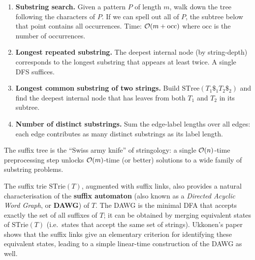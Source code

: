 \begin{enumerate}[nosep]
  \item \textbf{Substring search.}
        Given a pattern $P$ of length $m$, walk down the tree following
        the characters of $P$.
        If we can spell out all of $P$, the subtree below that point
        contains all occurrences.
        Time: $\mathcal{O}\!\left(m + \text{occ}\right)$ where $\text{occ}$ is the number
        of occurrences.

  \item \textbf{Longest repeated substring.}
        The deepest internal node (by string-depth) corresponds to the
        longest substring that appears at least twice.
        A single DFS suffices.

  \item \textbf{Longest common substring of two strings.}
        Build $\mathrm{STree}(T_1 \$_1 T_2 \$_2)$ and find the
        deepest internal node that has leaves from both $T_1$ and $T_2$
        in its subtree.

  \item \textbf{Number of distinct substrings.}
        Sum the edge-label lengths over all edges: each edge contributes
        as many distinct substrings as its label length.
\end{enumerate}

\begin{observation}
  The suffix tree is the ``Swiss army knife'' of stringology: a single
  $\mathcal{O}\!\left(n\right)$-time preprocessing step unlocks $\mathcal{O}\!\left(m\right)$-time (or better)
  solutions to a wide family of substring problems.
\end{observation}

\begin{remark}
  \label{rem:dawg}
  The suffix trie $\mathrm{STrie}(T)$, augmented with suffix links,
  also provides a natural characterisation of the \textbf{suffix
  automaton} (also known as a \emph{Directed Acyclic Word Graph},
  or \textbf{DAWG}) of $T$.
  The DAWG is the minimal DFA that accepts exactly the set of all
  suffixes of $T$; it can be obtained by merging equivalent states of
  $\mathrm{STrie}(T)$ (i.e.\ states that accept the same set of
  strings).
  Ukkonen's paper shows that the suffix links give an elementary
  criterion for identifying these equivalent states, leading to a
  simple linear-time construction of the DAWG as well.
\end{remark}
